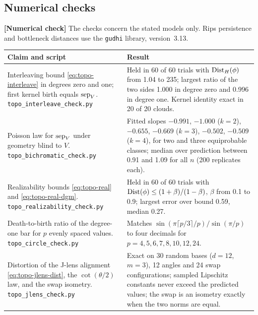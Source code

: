 \documentclass[11pt,a4paper]{article}
\newcommand{\evl}[2]{{\small\bfseries\color{#1}[#2]}}
\newcommand{\LNum}{\evl{cnum}{Numerical check}}
\begin{document}
\subsection{Numerical checks}
\label{app:topo-checks}

\LNum{} The checks concern the stated models only. Rips persistence and
bottleneck distances use the \texttt{gudhi} library, version~3.13.

\begin{center}\small
\begin{tabular}{@{}P{5.9cm}P{9.6cm}@{}}
\toprule
Claim and script & Result \\
\midrule
Interleaving bound \eqref{eq:topo-interleave} in degrees zero and one; first
kernel birth equals $\operatorname{sep}_V$. \newline\texttt{topo\_interleave\_check.py}
& Held in 60 of 60 trials with $\operatorname{Dist}_H(\phi)$ from 1.04 to 235; largest ratio
of the two sides 1.000 in degree zero and 0.996 in degree one. Kernel identity
exact in 20 of 20 clouds. \\ \addlinespace
Poisson law for $\operatorname{sep}_V$ under geometry blind to $V$.
\newline\texttt{topo\_bichromatic\_check.py}
& Fitted slopes $-0.991$, $-1.000$ ($k=2$), $-0.655$, $-0.669$ ($k=3$),
$-0.502$, $-0.509$ ($k=4$), for two and three equiprobable classes; median
over prediction between 0.91 and 1.09 for all $n$ (200 replicates each). \\
\addlinespace
Realizability bounds \eqref{eq:topo-real} and \eqref{eq:topo-real-dgm}.
\newline\texttt{topo\_realizability\_check.py}
& Held in 60 of 60 trials with $\operatorname{Dist}(\phi)\le(1+\beta)/(1-\beta)$,
$\beta$ from 0.1 to 0.9; largest error over bound 0.59, median 0.27. \\
\addlinespace
Death-to-birth ratio of the degree-one bar for $p$ evenly spaced values.
\newline\texttt{topo\_circle\_check.py}
& Matches $\sin(\pi\lceil p/3\rceil/p)/\sin(\pi/p)$ to four decimals for
$p=4,5,6,7,8,10,12,24$. \\
\addlinespace
Distortion of the J-lens alignment \eqref{eq:topo-jlens-dist}, the
$\cot(\theta/2)$ law, and the swap isometry.
\newline\texttt{topo\_jlens\_check.py}
& Exact on 30 random bases ($d=12$, $m=3$), 12 angles and 24 swap
configurations; sampled Lipschitz constants never exceed the predicted
values; the swap is an isometry exactly when the two norms are equal. \\
\bottomrule
\end{tabular}
\end{center}
\end{document}
